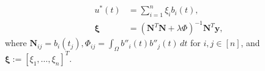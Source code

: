 \documentclass{article}
\newcommand{\hiltilde}[1]{\widetilde{\mathcal{H}}^{#1}\left(\Omega;\mathbb{R}\right)}
\begin{document}
\begin{align}\label{eq:spline_bspline_1}
     u^*(t) &= \sum^n_{i=1} \xi_ib_i(t),\\
     \boldsymbol{\xi} &= \left(\mathbf{N}^T\mathbf{N} + \lambda\Phi\right)^{-1}\mathbf{N}^T\mathbf{y},
\end{align}
where $\mathbf{N}_{ij} = b_i(t_j), \Phi_{ij} = \int_\Omega b''_i(t)b''_j(t)\,dt$ for $i, j \in [n]$, and $\boldsymbol{\xi} := [\xi_1,\dots,\xi_n]^T$.
\end{document}
